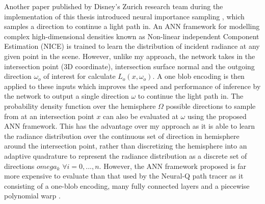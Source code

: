 \documentclass[../dissertation.tex]{subfiles}
\begin{document}
 Another paper published by Disney's Zurich research team during the implementation of this thesis introduced neural importance sampling \cite{muller2018neural}, which samples a direction to continue a light path in. An ANN framework for modelling complex high-dimensional densities known as Non-linear independent Component Estimation (NICE) \cite{dinh2014nice} is trained to learn the distribution of incident radiance at any given point in the scene. However, unlike my approach, the network takes in the intersection point (3D coordinate), intersection surface normal and the outgoing direction $\omega_o$ of interest for calculate $L_o(x, \omega_o)$. A one blob encoding is then applied to these inputs which improves the speed and performance of inference by the network to output a single direction $\omega$ to continue the light path in. The probability density function over the hemisphere $\Omega$ possible directions to sample from at an intersection point $x$ can also be evaluated at $\omega$ using the proposed ANN framework. This has the advantage over my approach as it is able to learn the radiance distribution over the continuous set of direction in hemisphere around the intersection point, rather than discretizing the hemisphere into an adaptive quadrature to represent the radiance distribution as a discrete set of directions $omega_k$ $\forall i = 0, ..., n$. However, the ANN framework proposed is far more expensive to evaluate than that used by the Neural-Q path tracer as it consisting of a one-blob encoding, many fully connected layers and a piecewise polynomial warp \cite{muller2018neural}.
\end{document}
